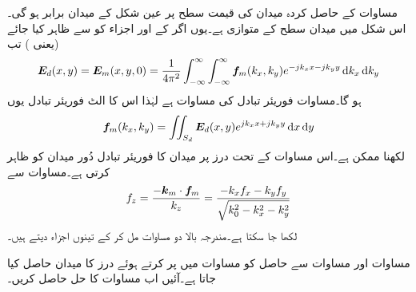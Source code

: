 مساوات  کے حاصل کردہ میدان کی قیمت سطح  پر  عین شکل  کے میدان برابر ہو گی۔اس شکل میں میدان  سطح کے متوازی ہے۔یوں اگر  کے  اور  اجزاء کو  سے ظاہر کیا جائے (یعنی ) تب
\begin{align}\label{مساوات_اینٹینا_دور_میدان_فوریئر_الف}
\kvec{E}_d (x,y)=\kvec{E}_m(x,y,0)=\frac{1}{4\pi^2} \int_{-\infty}^{\infty} \int_{-\infty}^{\infty} \kvec{f}_m(k_x,k_y)e^{-j k_x x -j k_y y} \dif k_x \dif k_y
\end{align}
ہو گا۔مساوات  فوریئر تبادل کی مساوات ہے لہٰذا اس کا الٹ فوریئر تبادل یوں
\begin{align}\label{مساوات_اینٹینا_دور_میدان_فوریئر_ب}
\kvec{f}_m(k_x,k_y)=\iint_{S_d} \kvec{E}_d(x,y) e^{j k_x x +j k_y y} \dif x \dif y
\end{align}
 لکھنا ممکن ہے۔اس مساوات کے تحت درز پر میدان کا فوریئر تبادل دُور میدان کو ظاہر کرتی ہے۔مساوات  سے
\begin{align}\label{مساوات_اینٹینا_دور_میدان_فوریئر_پ}
f_z=\frac{-{{\boldsymbol{k}}}_m\cdot{\ensuremath{{\boldsymbol{f}}}}_m}{k_z}=\frac{-k_x f_x-k_y f_y}{\sqrt{k_0^2-k_x^2-k_y^2}}
\end{align}
لکھا جا سکتا ہے۔مندرجہ بالا دو مساوات مل کر   کے تینوں اجزاء دیتے ہیں۔

مساوات  اور مساوات  سے حاصل   کو مساوات  میں پر کرتے ہوئے درز کا میدان حاصل کیا جاتا ہے۔آئیں اب مساوات  کا حل حاصل کریں۔


